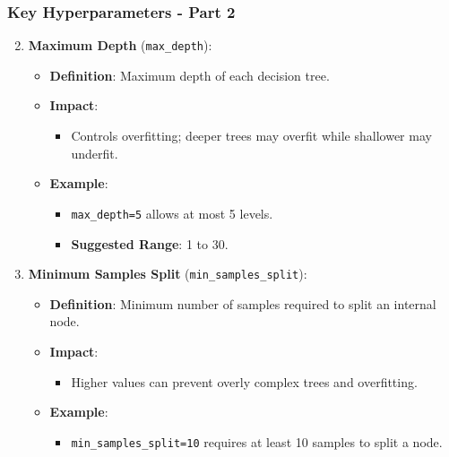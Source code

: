 \documentclass[aspectratio=169]{beamer}
\begin{document}
\begin{frame}[fragile]
    \frametitle{Key Hyperparameters - Part 2}
    \begin{enumerate}
        \setcounter{enumi}{1}
        \item \textbf{Maximum Depth} (\texttt{max\_depth}):
        \begin{itemize}
            \item \textbf{Definition}: Maximum depth of each decision tree.
            \item \textbf{Impact}:
            \begin{itemize}
                \item Controls overfitting; deeper trees may overfit while shallower may underfit.
            \end{itemize}
            \item \textbf{Example}: 
            \begin{itemize}
                \item \texttt{max\_depth=5} allows at most 5 levels.
                \item \textbf{Suggested Range}: 1 to 30.
            \end{itemize}
        \end{itemize}
        
        \item \textbf{Minimum Samples Split} (\texttt{min\_samples\_split}):
        \begin{itemize}
            \item \textbf{Definition}: Minimum number of samples required to split an internal node.
            \item \textbf{Impact}: 
            \begin{itemize}
                \item Higher values can prevent overly complex trees and overfitting.
            \end{itemize}
            \item \textbf{Example}: 
            \begin{itemize}
                \item \texttt{min\_samples\_split=10} requires at least 10 samples to split a node.
            \end{itemize}
        \end{itemize}
    \end{enumerate}
\end{frame}
\end{document}
